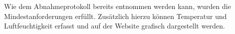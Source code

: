 Wie dem Abnahmeprotokoll bereits entnommen werden kann, wurden die Mindestanforderungen erfüllt.
Zusätzlich hierzu können Temperatur und Luftfeuchtigkeit erfasst und auf der Website grafisch dargestellt werden.